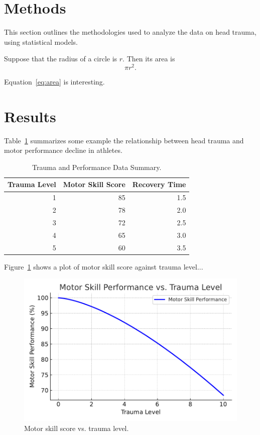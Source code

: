 \documentclass[12pt]{article}
\begin{document}
\section{Methods}
\label{sec:meth}

This section outlines the methodologies used to analyze the data on head trauma, using statistical models.

Suppose that the radius of a circle is $r$. Then its area is
\begin{equation}
  \label{eq:area}
  \pi r^2.
\end{equation}

Equation~\eqref{eq:area} is interesting. \lipsum[1]



\section{Results}
\label{sec:resu}

Table~\ref{tab:trauma_performance} summarizes some example the relationship between head trauma and motor performance decline in athletes.  \lipsum[1]

\lipsum[1]

\begin{table}[tbp]
  \caption{Trauma and Performance Data Summary.}
  \label{tab:trauma_performance}
\centering
\begin{tabular}{rrr}
  \toprule
Trauma Level & Motor Skill Score & Recovery Time \\ 
  \midrule
  1 & 85 & 1.5 \\ 
  2 & 78 & 2.0 \\ 
  3 & 72 & 2.5 \\ 
  4 & 65 & 3.0 \\ 
  5 & 60 & 3.5 \\ 
   \bottomrule
\end{tabular}
\end{table}

Figure~\ref{fig:performance_decline} shows a plot of motor skill score against trauma level... \lipsum[1]



\begin{figure}[tbp]
  \centering
  \includegraphics[width=\textwidth]{performance_decline.pdf}
  \caption{Motor skill score vs. trauma level.}
  \label{fig:performance_decline}
\end{figure}
\end{document}

